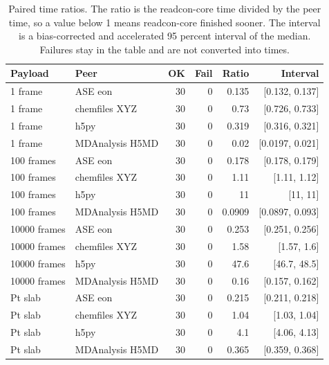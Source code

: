 \begin{table}[ht]
\centering
\small
\caption{Paired time ratios. The ratio is the readcon-core time divided by the peer time, so a value below 1 means readcon-core finished sooner. The interval is a bias-corrected and accelerated 95 percent interval of the median. Failures stay in the table and are not converted into times.}
\label{tab:ratios}
\footnotesize
\setlength{\tabcolsep}{4pt}
\begin{tabular}{llrrrr}
\toprule
Payload & Peer & OK & Fail & Ratio & Interval \\
\midrule
1 frame & ASE eon & 30 & 0 & 0.135 & [0.132, 0.137] \\
1 frame & chemfiles XYZ & 30 & 0 & 0.73 & [0.726, 0.733] \\
1 frame & h5py & 30 & 0 & 0.319 & [0.316, 0.321] \\
1 frame & MDAnalysis H5MD & 30 & 0 & 0.02 & [0.0197, 0.021] \\
100 frames & ASE eon & 30 & 0 & 0.178 & [0.178, 0.179] \\
100 frames & chemfiles XYZ & 30 & 0 & 1.11 & [1.11, 1.12] \\
100 frames & h5py & 30 & 0 & 11 & [11, 11] \\
100 frames & MDAnalysis H5MD & 30 & 0 & 0.0909 & [0.0897, 0.093] \\
10000 frames & ASE eon & 30 & 0 & 0.253 & [0.251, 0.256] \\
10000 frames & chemfiles XYZ & 30 & 0 & 1.58 & [1.57, 1.6] \\
10000 frames & h5py & 30 & 0 & 47.6 & [46.7, 48.5] \\
10000 frames & MDAnalysis H5MD & 30 & 0 & 0.16 & [0.157, 0.162] \\
Pt slab & ASE eon & 30 & 0 & 0.215 & [0.211, 0.218] \\
Pt slab & chemfiles XYZ & 30 & 0 & 1.04 & [1.03, 1.04] \\
Pt slab & h5py & 30 & 0 & 4.1 & [4.06, 4.13] \\
Pt slab & MDAnalysis H5MD & 30 & 0 & 0.365 & [0.359, 0.368] \\
\bottomrule
\end{tabular}
\end{table}
